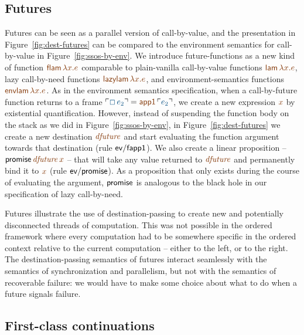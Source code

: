 \subsection{Futures}
\label{sec:dest-futures}

Futures can be seen as a parallel version of call-by-value, and the
presentation in Figure~\ref{fig:dest-futures} can be compared to the
environment semantics for call-by-value in
Figure~\ref{fig:ssos-by-env}. We introduce future-functions as a new
kind of function $\lf{{\sf flam}\,\lambda x.e}$ comparable to plain-vanilla
call-by-value functions $\lf{{\sf lam}\,\lambda x.e}$, lazy call-by-need
functions $\lf{{\sf lazylam}\,\lambda x.e}$, and environment-semantics
functions $\lf{{\sf envlam}\,\lambda x.e}$. As in the environment semantics
specification, when a call-by-future function returns to a frame
$\interp{\Box\,e_2} = \lf{{\sf app1}\,\interp{e_2}}$,
 we create a new expression $\lf{x}$
by existential quantification. However, instead of suspending the
function body on the stack as we did in Figure~\ref{fig:ssos-by-env},
in Figure~\ref{fig:dest-futures} we create a new destination $\lf{\it
  dfuture}$ and start evaluating the function argument towards that
destination (rule ${\sf ev/fapp1}$). We also create a linear
proposition -- ${\sf promise}\,\lf{\it dfuture}\,\lf{x}$ -- that will take
any value returned to $\lf{\it dfuture}$ and permanently bind it to $\lf{x}$
(rule ${\sf ev/promise}$). As a proposition that only exists during
the course of evaluating the argument, ${\sf promise}$ is analogous to
the black hole in our specification of lazy call-by-need.

Futures illustrate the use of destination-passing to create new and
potentially disconnected threads of computation. This was not possible
in the ordered framework where every computation had to be somewhere
specific in the ordered context relative to the current computation --
either to the left, or to the right. The destination-passing semantics
of futures interact seamlessly with the semantics of
synchronization and parallelism, but not with the semantics of
recoverable failure: we would have to make some choice about what to 
do when a future signals failure.


\subsection{First-class continuations}
\label{sec:dest-continuations}

